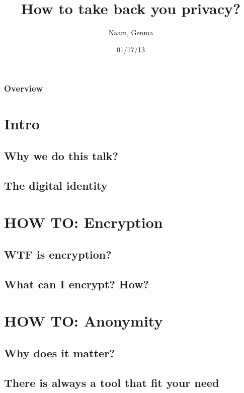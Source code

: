 \documentclass{beamer}
\title[Anonymity and encryption]{How to take back you privacy?}
\author{Naam, Genma}
\institute[@Gconfs]{
EPITA / Gconfs\\
\textit{naam@riseup.net\\ genma@riseup.net}
}
\date{01/17/13}
\begin{document}
\begin{frame}
\titlepage
\end{frame}
\begin{frame}
\frametitle{Overview}
\tableofcontents
\end{frame}


\section{Intro}
\subsection{Why we do this talk?}
\subsection{The digital identity}


\section{HOW TO: Encryption}
\subsection{WTF is encryption?}
\subsection{What can I encrypt? How?}


\section{HOW TO: Anonymity}
\subsection{Why does it matter?}
\subsection{There is always a tool that fit your need}

\end{document}

